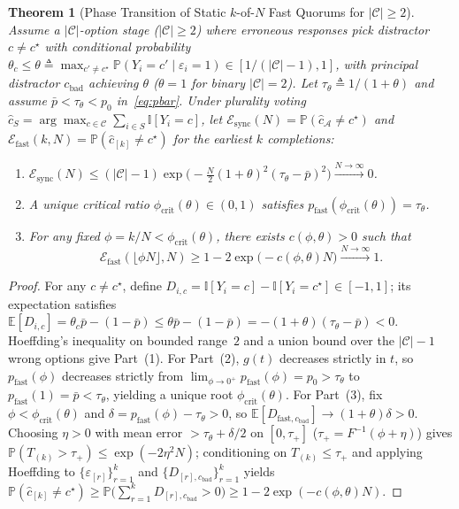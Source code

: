 \documentclass[conference]{IEEEtran}
\newtheorem{theorem}{Theorem}
\theoremstyle{definition}
\theoremstyle{remark}
\newcommand{\phicrit}{\phi_{\mathrm{crit}}}
\newcommand{\Prob}{\mathbb{P}}
\newcommand{\E}{\mathbb{E}}
\newcommand{\Ind}{\mathbb{I}}
\begin{document}
\begin{theorem}[Phase Transition of Static $k$-of-$N$ Fast Quorums for $|\mathcal{C}| \ge 2$]\label{thm:phase}
Assume a $|\mathcal{C}|$-option stage ($|\mathcal{C}| \ge 2$) where erroneous responses pick distractor $c \neq c^\star$ with conditional probability $\theta_c \le \theta \triangleq \max_{c' \neq c^\star}\Prob(Y_i = c' \mid \varepsilon_i = 1) \in [1/(|\mathcal{C}|-1), 1]$, with principal distractor $c_{\mathrm{bad}}$ achieving $\theta$ ($\theta = 1$ for binary $|\mathcal{C}| = 2$). Let $\tau_\theta \triangleq 1/(1 + \theta)$ and assume $\bar{p} < \tau_\theta < p_0$ in~\eqref{eq:pbar}. Under plurality voting $\hat{c}_S = \arg\max_{c \in \mathcal{C}}\sum_{i \in S}\Ind[Y_i = c]$, let $\mathcal{E}_{\mathrm{sync}}(N) = \Prob(\hat{c}_{\mathcal{A}} \neq c^\star)$ and $\mathcal{E}_{\mathrm{fast}}(k, N) = \Prob(\hat{c}_{[k]} \neq c^\star)$ for the earliest $k$ completions:
\begin{enumerate}
  \item $\mathcal{E}_{\mathrm{sync}}(N) \le (|\mathcal{C}| - 1)\exp\!\big(-\frac{N}{2}(1 + \theta)^2(\tau_\theta - \bar{p})^2\big) \xrightarrow{N \to \infty} 0$.
  \item A unique critical ratio $\phicrit(\theta) \in (0, 1)$ satisfies $p_{\mathrm{fast}}(\phicrit(\theta)) = \tau_\theta$.
  \item For any fixed $\phi = k/N < \phicrit(\theta)$, there exists $c(\phi, \theta) > 0$ such that
  \begin{equation}\label{eq:thm1_bound}
    \mathcal{E}_{\mathrm{fast}}(\lfloor \phi N \rfloor, N) \ge 1 - 2\exp\!\big(-c(\phi, \theta) N\big) \xrightarrow{N \to \infty} 1.
  \end{equation}
\end{enumerate}
\end{theorem}

\begin{proof}
For any $c \neq c^\star$, define $D_{i,c} = \Ind[Y_i = c] - \Ind[Y_i = c^\star] \in [-1, 1]$; its expectation satisfies $\E[D_{i,c}] = \theta_c\bar{p} - (1 - \bar{p}) \le \theta\bar{p} - (1 - \bar{p}) = -(1 + \theta)(\tau_\theta - \bar{p}) < 0$. Hoeffding's inequality on bounded range~$2$ and a union bound over the $|\mathcal{C}| - 1$ wrong options give Part~(1). For Part~(2), $g(t)$ decreases strictly in $t$, so $p_{\mathrm{fast}}(\phi)$ decreases strictly from $\lim_{\phi \to 0^+} p_{\mathrm{fast}}(\phi) = p_0 > \tau_\theta$ to $p_{\mathrm{fast}}(1) = \bar{p} < \tau_\theta$, yielding a unique root $\phicrit(\theta)$. For Part~(3), fix $\phi < \phicrit(\theta)$ and $\delta = p_{\mathrm{fast}}(\phi) - \tau_\theta > 0$, so $\E[D_{\mathrm{fast}, c_{\mathrm{bad}}}] \to (1 + \theta)\delta > 0$. Choosing $\eta > 0$ with mean error $> \tau_\theta + \delta/2$ on $[0, \tau_+]$ ($\tau_+ = F^{-1}(\phi + \eta)$) gives $\Prob(T_{(k)} > \tau_+) \le \exp(-2\eta^2 N)$; conditioning on $T_{(k)} \le \tau_+$ and applying Hoeffding to $\{\varepsilon_{[r]}\}_{r=1}^k$ and $\{D_{[r],c_{\mathrm{bad}}}\}_{r=1}^k$ yields $\Prob(\hat{c}_{[k]} \neq c^\star) \ge \Prob\!\big(\sum_{r=1}^k D_{[r],c_{\mathrm{bad}}} > 0\big) \ge 1 - 2\exp(-c(\phi, \theta)N)$.
\end{proof}
\end{document}
